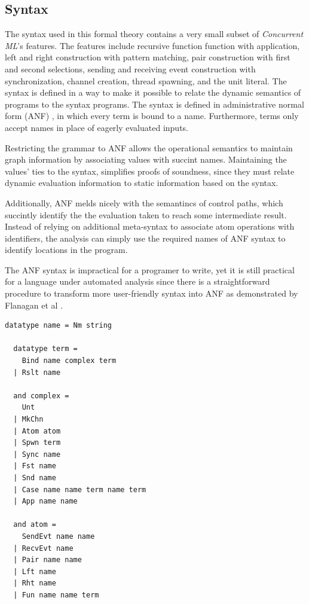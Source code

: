 \documentclass[10pt]{article}
\begin{document}
\subsection{Syntax}
The syntax used in this formal theory contains a very small subset of
\textit{Concurrent ML}'s features. The features include recursive function function with
application, left and right construction with pattern matching, pair construction with first
and second selections, sending and receiving event construction with synchronization,
channel creation, thread spawning, and the unit literal. The syntax is defined in a way to
make it possible to relate the dynamic semantics of programs to the syntax programs.
The syntax is defined in administrative normal form (ANF) \cite{}, in which every term
is bound to a name. Furthermore, terms only accept names in place of eagerly evaluated
inputs. 

Restricting the grammar to ANF allows the operational semantics
to maintain graph information by associating values with succint names.
Maintaining the values' ties to the syntax,
simplifies proofs of soundness, since they must relate dynamic evaluation information
to static information based on the syntax.

Additionally, ANF melds nicely with the semantincs of control paths, which succintly identify
the the evaluation taken to reach some intermediate result.
Instead of relying on additional meta-syntax to associate atom operations with identifiers,
the analysis can simply use the required names of ANF syntax to identify locations in the program.

The ANF syntax is impractical for a programer to write,
yet it is still practical for a language under automated analysis
since there is a straightforward procedure to transform
more user-friendly syntax into ANF as demonstrated by Flanagan et al \cite{}.


\begin{lstlisting}[language=logic]
  datatype name = Nm string

  datatype term = 
    Bind name complex term 
  | Rslt name

  and complex = 
    Unt
  | MkChn
  | Atom atom
  | Spwn term 
  | Sync name
  | Fst name
  | Snd name
  | Case name name term name term 
  | App name name

  and atom = 
    SendEvt name name
  | RecvEvt name
  | Pair name name
  | Lft name
  | Rht name
  | Fun name name term 
\end{lstlisting}
\end{document}
